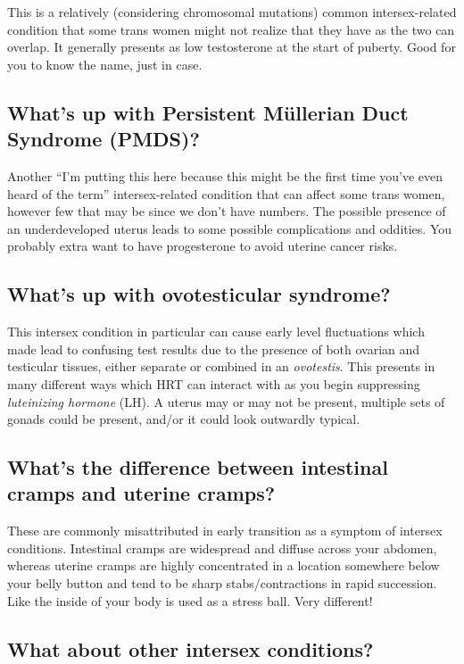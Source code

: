 \documentclass{article}
\begin{document}
This is a relatively (considering chromosomal mutations) common intersex-related condition that some trans women might not realize that they have as the two can overlap. It generally presents as low testosterone at the start of puberty. Good for you to know the name, just in case.

\subsection{What’s up with Persistent Müllerian Duct Syndrome (PMDS)?}

Another “I’m putting this here because this might be the first time you’ve even heard of the term” intersex-related condition that can affect some trans women, however few that may be since we don’t have numbers. The possible presence of an underdeveloped uterus leads to some possible complications and oddities. You probably extra want to have progesterone to avoid uterine cancer risks.

\subsection{What's up with ovotesticular syndrome?}

This intersex condition in particular can cause early level fluctuations which made lead to confusing test results due to the presence of both ovarian and testicular tissues, either separate or combined in an \textit{ovotestis}. This presents in many different ways which HRT can interact with as you begin suppressing \textit{luteinizing hormone} (LH). A uterus may or may not be present, multiple sets of gonads could be present, and/or it could look outwardly typical.

\subsection{What’s the difference between intestinal cramps and uterine cramps?}\label{11-35}

These are commonly misattributed in early transition as a symptom of intersex conditions. Intestinal cramps are widespread and diffuse across your abdomen, whereas uterine cramps are highly concentrated in a location somewhere below your belly button and tend to be sharp stabs/contractions in rapid succession. Like the inside of your body is used as a stress ball. Very different!

\subsection{What about other intersex conditions?}
\end{document}
